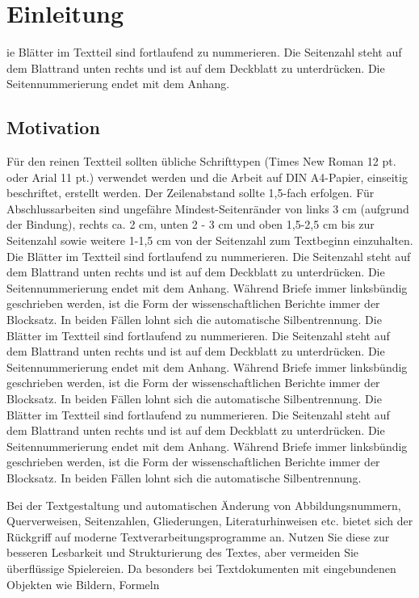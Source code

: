 \chapter{Einleitung}
\thispagestyle{fancy}
ie Blätter im Textteil sind fortlaufend zu nummerieren. Die Seitenzahl steht auf dem
Blattrand unten rechts und ist auf dem Deckblatt zu unterdrücken. Die Seitennummerierung
endet mit dem Anhang.

\section{Motivation}
Für den reinen Textteil sollten übliche Schrifttypen (Times New Roman 12 pt. oder Arial
11 pt.) verwendet werden und die Arbeit auf DIN A4-Papier, einseitig beschriftet, erstellt
werden. Der Zeilenabstand sollte 1,5-fach erfolgen. Für Abschlussarbeiten sind ungefähre
Mindest-Seitenränder von links 3 cm (aufgrund der Bindung), rechts ca. 2 cm,
unten 2 - 3 cm und oben 1,5-2,5 cm bis zur Seitenzahl sowie weitere 1-1,5 cm von der
Seitenzahl zum Textbeginn einzuhalten.
Die Blätter im Textteil sind fortlaufend zu nummerieren. Die Seitenzahl steht auf dem
Blattrand unten rechts und ist auf dem Deckblatt zu unterdrücken. Die Seitennummerierung
endet mit dem Anhang.
Während Briefe immer linksbündig geschrieben werden, ist die Form der wissenschaftlichen
Berichte immer der Blocksatz. In beiden Fällen lohnt sich die automatische Silbentrennung.
Die Blätter im Textteil sind fortlaufend zu nummerieren. Die Seitenzahl steht auf dem
Blattrand unten rechts und ist auf dem Deckblatt zu unterdrücken. Die Seitennummerierung
endet mit dem Anhang.
Während Briefe immer linksbündig geschrieben werden, ist die Form der wissenschaftlichen
Berichte immer der Blocksatz. In beiden Fällen lohnt sich die automatische Silbentrennung.
Die Blätter im Textteil sind fortlaufend zu nummerieren. Die Seitenzahl steht auf dem
Blattrand unten rechts und ist auf dem Deckblatt zu unterdrücken. Die Seitennummerierung
endet mit dem Anhang.
Während Briefe immer linksbündig geschrieben werden, ist die Form der wissenschaftlichen
Berichte immer der Blocksatz. In beiden Fällen lohnt sich die automatische Silbentrennung.

Bei der Textgestaltung und automatischen Änderung von Abbildungsnummern, Querverweisen,
Seitenzahlen, Gliederungen, Literaturhinweisen etc. bietet sich der Rückgriff
auf moderne Textverarbeitungsprogramme an. Nutzen Sie diese zur besseren Lesbarkeit
und Strukturierung des Textes, aber vermeiden Sie überflüssige Spielereien. Da
besonders bei Textdokumenten mit eingebundenen Objekten wie Bildern, Formeln

